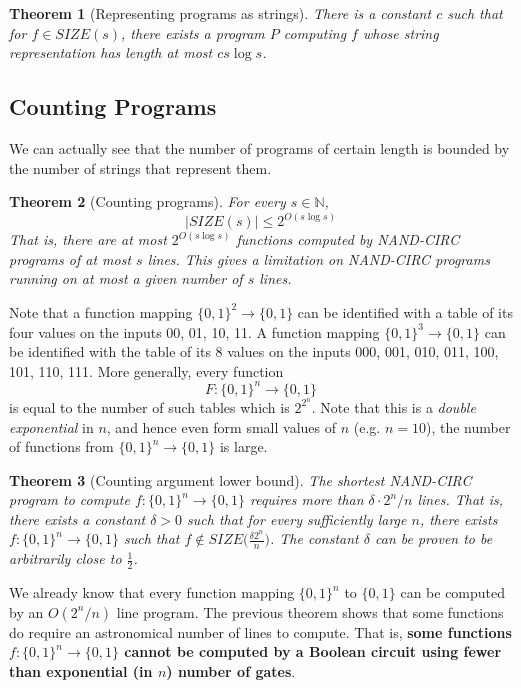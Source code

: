 \documentclass[a4paper, 12pt]{report}
\newtheorem{theorem}{Theorem}[section]
\theoremstyle{remark}
\theoremstyle{definition}
\begin{document}
\begin{theorem}[Representing programs as strings]
There is a constant $c$ such that for $f \in SIZE(s)$, there exists a program $P$ computing $f$ whose string representation has length at most $cs \log s$. 
\end{theorem}

\subsection{Counting Programs}
We can actually see that the number of programs of certain length is bounded by the number of strings that represent them. 

\begin{theorem}[Counting programs]
For every $s \in \mathbb{N}$, 
\[|SIZE(s)| \leq 2^{O(s \log s)}\]
That is, there are at most $2^{O (s \log s)}$ functions computed by NAND-CIRC programs of at most $s$ lines. This gives a limitation on NAND-CIRC programs running on at most a given number of $s$ lines. 
\end{theorem}

Note that a function mapping $\{0,1\}^2 \longrightarrow \{0, 1\}$ can be identified with a table of its four values on the inputs 00, 01, 10, 11. A function mapping $\{0,1\}^3 \longrightarrow \{0,1\}$ can be identified with the table of its 8 values on the inputs 000, 001, 010, 011, 100, 101, 110, 111. More generally, every function 
\[F: \{0,1\}^n \longrightarrow \{0,1\}\]
is equal to the number of such tables which is $2^{2^n}$. Note that this is a \textit{double exponential} in $n$, and hence even form small values of $n$ (e.g. $n = 10$), the number of functions from $\{0,1\}^n \longrightarrow \{0,1\}$ is large. 

\begin{theorem}[Counting argument lower bound]
The shortest NAND-CIRC program to compute $f: \{0,1\}^n \longrightarrow \{0,1\}$ requires more than $\delta \cdot 2^n / n$ lines. That is, there exists a constant $\delta > 0$ such that for every sufficiently large $n$, there exists $f: \{0,1\}^n \longrightarrow \{0,1\}$ such that $f \not\in SIZE\Big( \frac{\delta 2^n}{n}\Big)$. The constant $\delta$ can be proven to be arbitrarily close to $\frac{1}{2}$. 
\end{theorem}

We already know that every function mapping $\{0,1\}^n$ to $\{0,1\}$ can be computed by an $O(2^n / n)$ line program. The previous theorem shows that some functions do require an astronomical number of lines to compute. That is, \textbf{some functions $f: \{0,1\}^n \longrightarrow \{0,1\}$ cannot be computed by a Boolean circuit using fewer than exponential (in $n$) number of gates}. 
\end{document}
